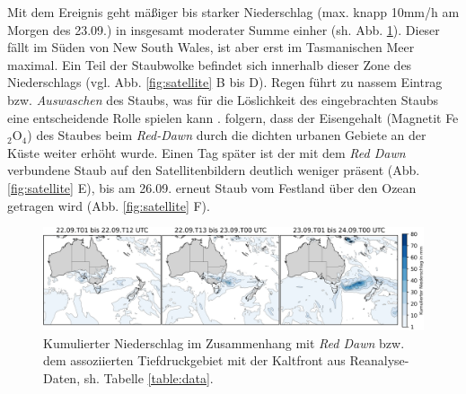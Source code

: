 \documentclass[12pt,a4paper,onecolumn,headheight=30pt]{scrartcl}
\begin{document}
Mit dem Ereignis geht mäßiger bis starker Niederschlag (max. knapp 10mm/h am Morgen des 23.09.) in insgesamt moderater Summe einher (sh. Abb. \ref{fig:rain}). Dieser fällt im Süden von New South Wales, ist aber erst im Tasmanischen Meer maximal. Ein Teil der Staubwolke befindet sich innerhalb dieser Zone des Niederschlags (vgl. Abb. \ref{fig:satellite} B bis D). Regen führt zu nassem Eintrag bzw. \textit{Auswaschen} des Staubs, was  für die Löslichkeit des eingebrachten Staubs eine entscheidende Rolle spielen kann \citep{Shao.2011}. \citet{Reynolds.2014} folgern, dass der Eisengehalt (Magnetit Fe$_2$O$_4$) des Staubes beim \textit{Red-Dawn} durch die dichten urbanen Gebiete an der Küste weiter erhöht wurde. Einen Tag später ist der mit dem \textit{Red Dawn} verbundene Staub auf den Satellitenbildern deutlich weniger präsent (Abb. \ref{fig:satellite} E), bis am 26.09. erneut Staub vom Festland über den Ozean getragen wird (Abb. \ref{fig:satellite} F).
\begin{figure}[htbp]
\includegraphics[width=\textwidth]{bilder/reddawn/rain.png}
\caption{Kumulierter Niederschlag im Zusammenhang mit \textit{Red Dawn} bzw. dem assoziierten Tiefdruckgebiet mit der Kaltfront aus Reanalyse-Daten, sh. Tabelle \ref{table:data}.} \label{fig:rain}
\end{figure}
\end{document}
